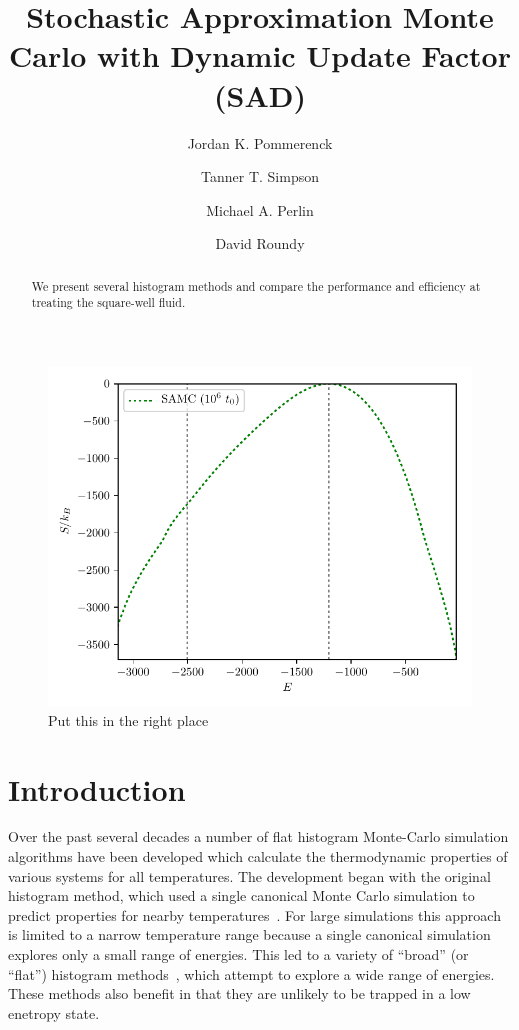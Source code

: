 \documentclass[letterpaper,twocolumn,amsmath,amssymb,pre,aps,10pt]{revtex4-1}
\begin{document}
\title{Stochastic Approximation Monte Carlo with Dynamic Update
Factor (SAD)
}

\author{Jordan K. Pommerenck} \author{Tanner T. Simpson}
\author{Michael A. Perlin} \author{David Roundy}

\begin{abstract}
  We present several histogram methods and compare the performance and
  efficiency at treating the square-well fluid.
\end{abstract}

\maketitle

\begin{figure}
  \includegraphics[width=\columnwidth]{figs/N500-lndos-comparison}
  \caption{Put this in the right place}
\end{figure}

\section{Introduction}
Over the past several decades a number of flat histogram Monte-Carlo
simulation algorithms have been developed which calculate the
thermodynamic properties of various systems for all temperatures.  The
development began with the original histogram method, which used a
single canonical Monte Carlo simulation to predict properties for
nearby temperatures~\cite{ferrenberg1988new}.  For large simulations
this approach is limited to a narrow temperature range because a single
canonical simulation explores only a small range of energies.  This led
to a variety of ``broad'' (or ``flat'') histogram
methods~\cite{penna1996broad, penna1998broad, swendsen1999transition,
wang2001determining, wang2001efficient, trebst2004optimizing}, which
attempt to explore a wide range of energies.  These methods also
benefit in that they are unlikely to be trapped in a low enetropy state.
\end{document}
